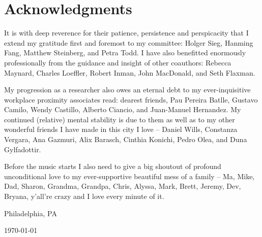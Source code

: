 \chapter*{Acknowledgments}

It is with deep reverence for their patience, persistence and perspicacity that I extend my gratitude first and foremost to my committee: Holger Sieg, Hanming Fang, Matthew Steinberg, and Petra Todd. I have also benefitted enormously professionally from the guidance and insight of other coauthors: Rebecca Maynard, Charles Loeffler, Robert Inman, John MacDonald, and Seth Flaxman.

My progression as a researcher also owes an eternal debt to my ever-inquisitive workplace proximity associates read: dearest friends, Pau Pereira Batlle, Gustavo Camilo, Wendy Castillo, Alberto Ciancio, and Juan-Manuel Hernandez. My continued (relative) mental stability is due to them as well as to my other wonderful friends I have made in this city I love -- Daniel Wills, Constanza Vergara, Ana Gazmuri, Alix Barasch, Cinthia Konichi, Pedro Olea, and Duna Gylfadottir.

Before the music starts I also need to give a big shoutout of profound unconditional love to my ever-supportive beautiful mess of a family -- Ma, Mike, Dad, Sharon, Grandma, Grandpa, Chris, Alyssa, Mark, Brett, Jeremy, Dev, Bryana, y'all're crazy and I love every minute of it.

\hfill \theauthor

\hfill Philadelphia, PA

\hfill \today
